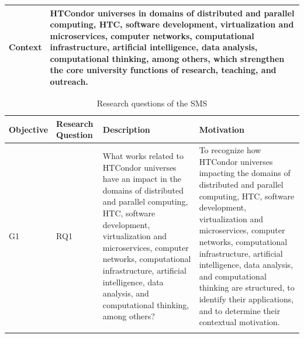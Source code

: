\begin{table}[htbp]
\begin{tabular}{p{1.4cm}p{6.4cm}}
		\addlinespace[0.8em]
		\textbf{Context}      & HTCondor universes in domains of distributed and parallel computing, HTC, software development, virtualization and microservices, computer networks, computational infrastructure, artificial intelligence, data analysis, computational thinking, among others, which strengthen the core university functions of research, teaching, and outreach.                                                                                                              \\
		\bottomrule
	\end{tabular}
\end{table}

\begin{table}[htbp]
	\centering
	\caption{Research questions of the SMS}
	\label{table:RQs}
	\renewcommand{\arraystretch}{1}  %
	\begin{tabular}{p{1cm}p{1.7cm}p{6.8cm}p{6.8cm}}
		\toprule
		\textbf{Objective} & \textbf{Research Question} & \textbf{Description}                                                                                                                                                                                                                                                                                          & \textbf{Motivation}                                                                                                                                                                                                                                                                                                                                                             \\
		\midrule
		G1                 & RQ1                        & What works related to HTCondor universes have an impact in the domains of distributed and parallel computing, HTC, software development, virtualization and microservices, computer networks, computational infrastructure, artificial intelligence, data analysis, and computational thinking, among others? & To recognize how HTCondor universes impacting the domains of distributed and parallel computing, HTC, software development, virtualization and microservices, computer networks, computational infrastructure, artificial intelligence, data analysis, and computational thinking are structured, to identify their applications, and to determine their contextual motivation. \\
		\addlinespace[0.8em]

\end{tabular}
\end{table}
